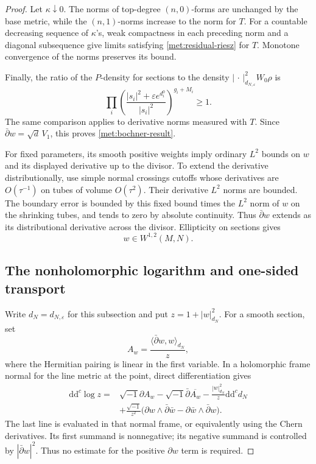 \documentclass[11pt,letterpaper]{article}
\newcommand{\ii}{\sqrt{-1}}
\newcommand{\ddc}{\mathrm{d}\mathrm{d}^{c}}
\theoremstyle{definition}
\theoremstyle{remark}
\begin{document}
\begin{proof}
Let \(\kappa\downarrow0\).  The norms of top-degree \((n,0)\)-forms
are unchanged by the base metric, while the \((n,1)\)-norms increase
to the norm for \(T\).  For a countable decreasing sequence of
\(\kappa\)'s, weak compactness in each preceding norm and a diagonal
subsequence give limits satisfying \eqref{met:residual-riesz} for
\(T\).  Monotone convergence of the norms preserves its bound.

Finally, the ratio of the \(P\)-density for sections to the density
\(|\,\cdot\,|_{d_{N,\varepsilon}}^2W_0\rho\) is
\begin{equation}
 \label{met:density-ratio}
 \prod_i\left(
   \frac{|s_i|^2+\varepsilon e^{d_i^0}}{|s_i|^2}
          \right)^{g_i+M_i}\geq1.
\end{equation}
The same comparison applies to derivative norms measured with \(T\).
Since \(\bar\partial w=\sqrt d\,V_1\), this proves
\eqref{met:bochner-result}.

For fixed parameters, its smooth positive weights imply ordinary
\(L^2\) bounds on \(w\) and its displayed derivative up to the
divisor.  To extend the derivative distributionally, use simple
normal crossings cutoffs whose derivatives are \(O(\tau^{-1})\) on
tubes of volume \(O(\tau^2)\).  Their derivative \(L^2\) norms are
bounded.  The boundary error is bounded by this fixed bound times
the \(L^2\) norm of \(w\) on the shrinking tubes, and tends to zero
by absolute continuity.  Thus \(\bar\partial w\) extends as its
distributional derivative across the divisor.  Ellipticity on
sections gives
\begin{equation}
 \label{met:sobolev-extension}
 w\in W^{1,2}(M,N).
\end{equation}

\subsection*{The nonholomorphic logarithm and one-sided transport}

Write \(d_N=d_{N,\varepsilon}\) for this subsection and put
\(z=1+|w|_{d_N}^2\).  For a smooth section, set
\[
 A_w=\frac{\langle\bar\partial w,w\rangle_{d_N}}z,
\]
where the Hermitian pairing is linear in the first variable.  In a
holomorphic frame normal for the line metric at the point, direct
differentiation gives
\begin{equation}
 \label{met:log-identity}
 \begin{split}
 \ddc\log z={}&\ii\partial A_w
       -\ii\bar\partial\overline{A_w}
       -\frac{|w|_{d_N}^2}{z}\ddc d_N\\
 &+\frac{\ii}{z^2}
       \bigl(\partial w\wedge\bar\partial\bar w
                 -\partial\bar w\wedge\bar\partial w\bigr).
 \end{split}
\end{equation}
The last line is evaluated in that normal frame, or equivalently
using the Chern derivatives.  Its first summand is nonnegative; its
negative summand is controlled by \(|\bar\partial w|^2\).  Thus no
estimate for the positive \(\partial w\) term is required.


\end{proof}
\end{document}
